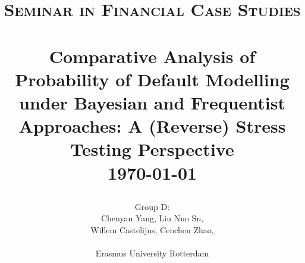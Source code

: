\documentclass[11pt]{article}
\begin{document}
\begin{titlepage}

\title{     

\normalsize \textsc{Seminar in Financial Case Studies}
		\\ [2.0cm]
		 \\
		\LARGE \textbf{Comparative Analysis of Probability of Default Modelling under Bayesian and Frequentist Approaches: A (Reverse) Stress Testing Perspective} %
		\\ [0.5cm]
		\normalsize \today \vspace*{5\baselineskip}}

\date{}

\author{    
		Group D: \\
		Chenyan Yang, Liu Nuo Su, \\
		Willem Castelijns, Cenchen Zhao, \\ 
		\\ 
		Erasmus University Rotterdam \\ [5.0cm]
		}

\maketitle

\thispagestyle{empty}
\end{titlepage}


\maketitle

\tableofcontents
\end{document}
